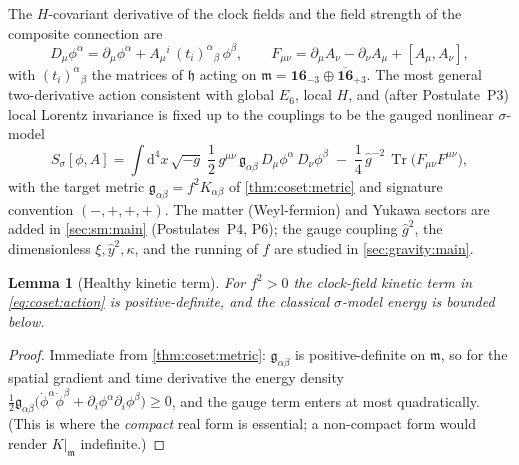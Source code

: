 \documentclass[11pt]{article}
\theoremstyle{plain}
\newtheorem{lemma}[theorem]{Lemma}
\theoremstyle{definition}
\theoremstyle{remark}
\newcommand{\Tr}{\operatorname{Tr}}
\newcommand{\dd}{\mathrm{d}}
\begin{document}
The $H$-covariant derivative of the clock fields and the field strength of the
composite connection are
\begin{equation}\label{eq:coset:covD}
  D_{\mu}\phi^{\alpha}
    = \partial_{\mu}\phi^{\alpha}
      + A_{\mu}{}^{i}\,(t_{i})^{\alpha}{}_{\beta}\,\phi^{\beta},
  \qquad
  F_{\mu\nu}
    = \partial_{\mu}A_{\nu} - \partial_{\nu}A_{\mu} + [A_{\mu},A_{\nu}],
\end{equation}
with $(t_{i})^{\alpha}{}_{\beta}$ the matrices of $\mathfrak h$ acting on
$\mathfrak m = \mathbf{16}_{-3}\oplus\overline{\mathbf{16}}_{+3}$. The most
general two-derivative action consistent with global $E_{6}$, local $H$, and
(after Postulate~P3) local Lorentz invariance is fixed up to the couplings to be
the gauged nonlinear $\sigma$-model
\begin{equation}\label{eq:coset:action}
  S_{\sigma}[\phi,A]
   = \int \dd^{4}x\,\sqrt{-g}\;
     \frac12\, g^{\mu\nu}\,\mathfrak g_{\alpha\beta}\,
       D_{\mu}\phi^{\alpha}\,D_{\nu}\phi^{\beta}
     \;-\;\frac14\,\hat g^{-2}\,\Tr\!\bigl(F_{\mu\nu}F^{\mu\nu}\bigr),
\end{equation}
with the target metric $\mathfrak g_{\alpha\beta} = f^{2}K_{\alpha\beta}$ of
\autoref{thm:coset:metric} and signature convention $(-,+,+,+)$. The matter
(Weyl-fermion) and Yukawa sectors are added in
\autoref{sec:sm:main} (Postulates~P4, P6); the gauge coupling $\hat g^{2}$,
the dimensionless $\xi,\hat y^{2},\kappa$, and the running of $f$ are studied in
\autoref{sec:gravity:main}.

\begin{lemma}[Healthy kinetic term]\label{lem:coset:positivity}
For $f^{2}>0$ the clock-field kinetic term in \eqref{eq:coset:action} is
positive-definite, and the classical $\sigma$-model energy is bounded below.
\end{lemma}

\begin{proof}
Immediate from \autoref{thm:coset:metric}: $\mathfrak g_{\alpha\beta}$ is
positive-definite on $\mathfrak m$, so for the spatial gradient and time
derivative the energy density
$\tfrac12\mathfrak g_{\alpha\beta}\bigl(\dot\phi^{\alpha}\dot\phi^{\beta}
+\partial_{i}\phi^{\alpha}\partial_{i}\phi^{\beta}\bigr)\ge 0$, and the gauge
term enters at most quadratically. (This is where the \emph{compact} real form
is essential; a non-compact form would render $K|_{\mathfrak m}$ indefinite.)
\end{proof}

\end{document}
